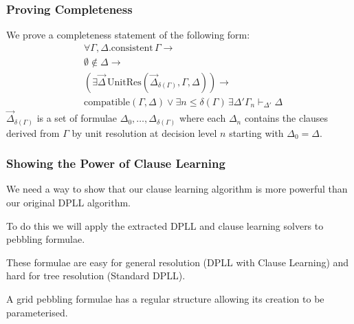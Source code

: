 \documentclass{beamer}
\newcommand{\compatible}[2]{\mathrm{compatible}(#1,#2)}
\newcommand{\consistent}{\mathrm{consistent\,}}
\newcommand{\DeltaVec}{\overrightarrow{\Delta}}
\begin{document}
\begin{frame}
\frametitle{Proving Completeness}
We prove a completeness statement of the following form:
\begin{align*}
 &\forall \Gamma, \Delta. \consistent{\Gamma} \to   \\ 
 &\emptyset \notin \Delta \to \\ 
&( \exists \DeltaVec \, \mathrm{UnitRes}(\DeltaVec_{\delta(\Gamma)} , \Gamma,  \Delta) )\to \\
&\compatible{\Gamma}{\Delta} \vee \exists n \leq \delta(\Gamma) \,    \exists \Delta'  \Gamma_n  \vdash_{\Delta'} \Delta
\end{align*}
$\DeltaVec_{\delta(\Gamma)}$ is a set of formulae $\Delta_0, \ldots, \Delta_{\delta(\Gamma)}$ where each $\Delta_n$ contains the clauses derived from $\Gamma$ by unit resolution at  decision level $n$ starting with $\Delta_0 = \Delta$.
\end{frame}


\begin{frame}
\frametitle{Showing the Power of Clause Learning}
We need a way to show that our clause learning algorithm is more powerful than our original DPLL algorithm. \\

\medskip

To do this we will apply the extracted DPLL and clause learning solvers to \alert{pebbling formulae}. \\

\medskip

These formulae are easy for general resolution (DPLL with Clause Learning) and hard for tree resolution (Standard DPLL). \\ 
\medskip

A \alert{grid pebbling formulae} has a regular structure allowing its creation to be parameterised.

\end{frame}
\end{document}
